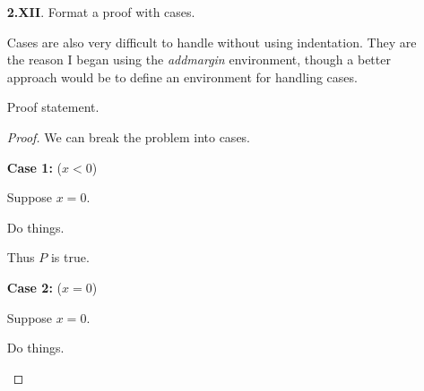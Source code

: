 \begin{enumerate}
\begin{proof}
          Next we prove a nested sublemma 2.
          \begin{addmargin}{1cm}
            \begin{lem}
              Sublemma proof statement.
            \end{lem}
            \begin{proof}
              Proof body. 
            \end{proof}
          \end{addmargin}

          Finally, by taking all of our lemmas together with the reference ~\cite{Steen} we can see the result is proven.
        \end{proof}

        Now we can include a corollary.
        \begin{cor}
          Corollary proof statement.
        \end{cor}
        \begin{proof}
          Corollary proof body.
        \end{proof}
        
      \qspace

      \item[\textbf{2.XII}.]
        Format a proof with cases.

        \aspace

        Cases are also very difficult to handle without using indentation. They are the reason I began using the \textit{addmargin} environment, though a better approach would be to define an environment for handling cases.

        \begin{lem}
          Proof statement.
        \end{lem}
        \begin{proof}
          We can break the problem into cases.

          \textbf{Case 1:} ($x<0$)
          \begin{addmargin}{1cm}
            Suppose $x=0$.

            Do things.

            Thus $P$ is true.
          \end{addmargin}

          \textbf{Case 2:} ($x=0$)
          \begin{addmargin}{1cm}
            Suppose $x=0$.

            Do things.


\end{addmargin}
\end{proof}
\end{enumerate}
